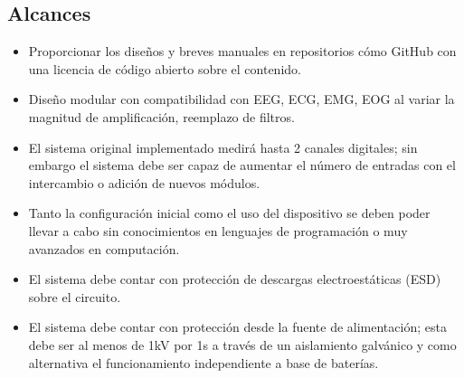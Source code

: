\subsection{Alcances}
\label{sec:org53dcaf1}
\begin{itemize}
\item Proporcionar los diseños y breves manuales en repositorios cómo GitHub con una licencia de código abierto sobre el contenido.\\
\item Diseño modular con compatibilidad con EEG, ECG, EMG, EOG al variar la magnitud de amplificación, reemplazo de filtros.\\
\item El sistema original implementado medirá hasta 2 canales digitales; sin embargo el sistema debe ser capaz de aumentar el número de entradas con el intercambio o adición de nuevos módulos.\\
\item Tanto la configuración inicial como el uso del dispositivo se deben poder llevar a cabo sin conocimientos en lenguajes de programación o muy avanzados en computación.\\
\item El sistema debe contar con protección de descargas electroestáticas (ESD) sobre el circuito.\\
\item El sistema debe contar con protección desde la fuente de alimentación; esta debe ser al menos de 1kV por 1s a través de un aislamiento galvánico y como alternativa el funcionamiento independiente a base de baterías.\\
\end{itemize}
